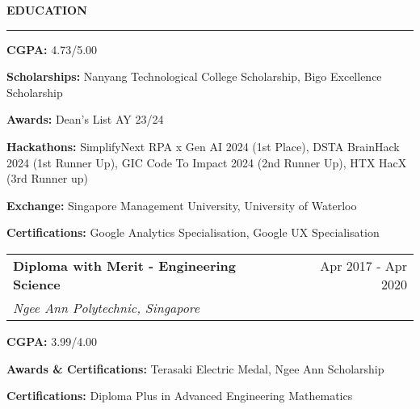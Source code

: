 \documentclass[11pt,letterpaper]{article}
\makeatletter
\newcommand{\resheading}[1]{%
  \vspace{2pt}
  {\normalsize \textbf{\MakeUppercase{#1}}}\\
  \vspace{-8pt}
  \hrule
}
\newcommand{\resitem}[1]{\item \small #1 \vspace{-2pt}}
\newcommand{\ressubheading}[4]{
    \vspace{2pt}
    \begin{tabular*}{\textwidth}{l@{\extracolsep{\fill}}r}
        \small \textbf{#1} & \small #2 \\
        \small \textit{#3} & \small \textit{#4} \\
    \end{tabular*}\vspace{-3pt}}
\makeatother
\begin{document}
\resheading{Education}
\begin{leftitemize}
\item[]
\begin{subitemize}
    \resitem{\textbf{CGPA:} 4.73/5.00}
    \resitem{\textbf{Scholarships:} Nanyang Technological College Scholarship, Bigo Excellence Scholarship}
    \resitem{\textbf{Awards:} Dean's List AY 23/24}
    \resitem{\textbf{Hackathons:} SimplifyNext RPA x Gen AI 2024 (1st Place), DSTA BrainHack 2024 (1st Runner Up), GIC Code To Impact 2024 (2nd Runner Up), HTX HacX (3rd Runner up)}
    \resitem{\textbf{Exchange:} Singapore Management University, University of Waterloo}
    \resitem{\textbf{Certifications:} Google Analytics Specialisation, Google UX Specialisation}
\end{subitemize}

\item[]
\ressubheading{Diploma with Merit - Engineering Science}{Apr 2017 - Apr 2020}{Ngee Ann Polytechnic, Singapore}{}
\begin{subitemize}
    \resitem{\textbf{CGPA:} 3.99/4.00}
    \resitem{\textbf{Awards \& Certifications:} Terasaki Electric Medal, Ngee Ann Scholarship}
    \resitem{\textbf{Certifications:} Diploma Plus in Advanced Engineering Mathematics}
\end{subitemize}
\end{leftitemize}
\end{document}
